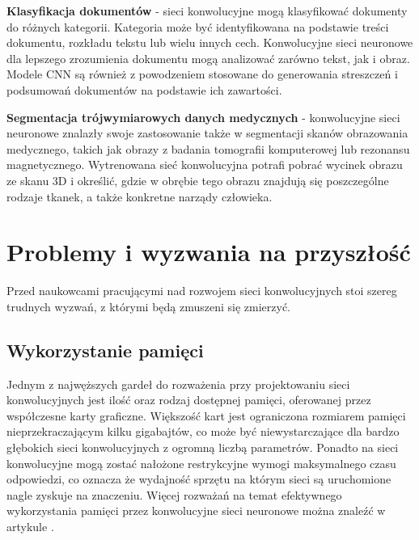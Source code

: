 \begin{enumerate*}
\item \textbf{Klasyfikacja dokumentów} - sieci konwolucyjne mogą klasyfikować dokumenty do różnych kategorii. Kategoria może być identyfikowana na podstawie treści dokumentu, rozkładu tekstu lub wielu innych cech. Konwolucyjne sieci neuronowe dla lepszego zrozumienia dokumentu mogą analizować zarówno tekst, jak i obraz. Modele CNN są również z powodzeniem stosowane do generowania streszczeń i podsumowań dokumentów na podstawie ich zawartości.
\item \textbf{Segmentacja trójwymiarowych danych medycznych} - konwolucyjne sieci neuronowe znalazły swoje zastosowanie także w segmentacji skanów obrazowania medycznego, takich jak obrazy z badania tomografii komputerowej lub rezonansu magnetycznego. Wytrenowana sieć konwolucyjna potrafi pobrać wycinek obrazu ze skanu 3D i określić, gdzie w obrębie tego obrazu znajdują się poszczególne rodzaje tkanek, a także konkretne narządy człowieka.
\end{enumerate*}

\section{Problemy i wyzwania na przyszłość}
Przed naukowcami pracującymi nad rozwojem sieci konwolucyjnych stoi szereg trudnych wyzwań, z którymi będą zmuszeni się zmierzyć.

\subsection{Wykorzystanie pamięci}
Jednym z najwęższych gardeł do rozważenia przy projektowaniu sieci konwolucyjnych jest ilość oraz rodzaj dostępnej pamięci, oferowanej przez współczesne karty graficzne. Większość kart jest ograniczona rozmiarem pamięci nieprzekraczającym kilku gigabajtów, co może być niewystarczające dla bardzo głębokich sieci konwolucyjnych z ogromną liczbą parametrów. Ponadto na sieci konwolucyjne mogą zostać nałożone restrykcyjne wymogi maksymalnego czasu odpowiedzi, co oznacza że wydajność sprzętu na którym sieci są uruchomione nagle zyskuje na znaczeniu. Więcej rozważań na temat efektywnego wykorzystania pamięci przez konwolucyjne sieci neuronowe można znaleźć w artykule \cite{cnn:memoryRequirements}.

